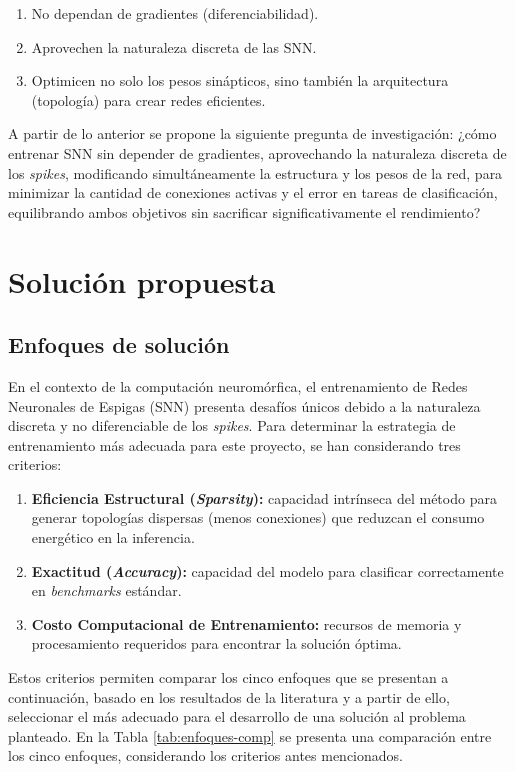 \begin{enumerate}
    \item No dependan de gradientes (diferenciabilidad).
    \item Aprovechen la naturaleza discreta de las SNN.
    \item Optimicen no solo los pesos sinápticos, sino también la arquitectura (topología) para crear redes eficientes.
\end{enumerate}

A partir de lo anterior se propone la siguiente pregunta de investigación: ¿cómo entrenar SNN sin depender de gradientes, aprovechando la naturaleza discreta de los \textit{spikes}, modificando simultáneamente la estructura y los pesos de la red, para minimizar la cantidad de conexiones activas y el error en tareas de clasificación, equilibrando ambos objetivos sin sacrificar significativamente el rendimiento?

\section{Solución propuesta}
\subsection{Enfoques de solución}

En el contexto de la computación neuromórfica, el entrenamiento de Redes Neuronales de Espigas (SNN) presenta desafíos únicos debido a la naturaleza discreta y no diferenciable de los \textit{spikes}. Para determinar la estrategia de entrenamiento más adecuada para este proyecto, se han considerando tres criterios:

\begin{enumerate}
    \item \textbf{Eficiencia Estructural (\textit{Sparsity}):} capacidad intrínseca del método para generar topologías dispersas (menos conexiones) que reduzcan el consumo energético en la inferencia.
    \item \textbf{Exactitud (\textit{Accuracy}):} capacidad del modelo para clasificar correctamente en \textit{benchmarks} estándar.
    \item \textbf{Costo Computacional de Entrenamiento:} recursos de memoria y procesamiento requeridos para encontrar la solución óptima.
\end{enumerate}

Estos criterios permiten comparar los cinco enfoques que se presentan a continuación, basado en los resultados de la literatura y a partir de ello, seleccionar el más adecuado para el desarrollo de una solución al problema planteado. En la Tabla \ref{tab:enfoques-comp} se presenta una comparación entre los cinco enfoques, considerando los criterios antes mencionados.

